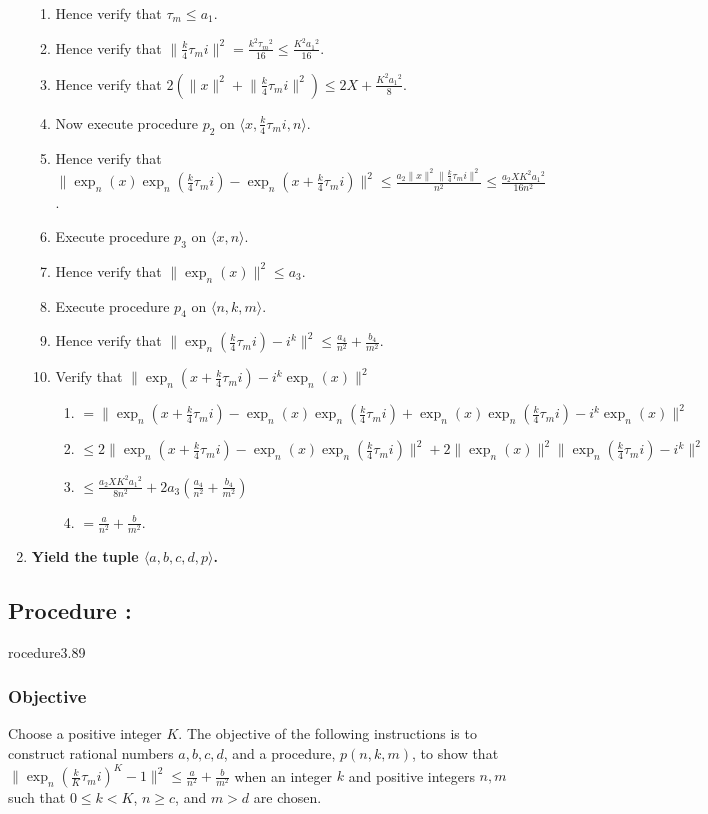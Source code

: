 \documentclass{article}
\newcounter{procedure}[part]
\newcommand{\procedure}[1]{\subsection*{Procedure \thepart:\theprocedure}\label{sec:procedure #1}\global\expandafter\edef\csname procedure#1\endcsname{\thepart:\theprocedure}\addtocounter{procedure}{1}}
\newcommand{\objective}{\subsubsection*{Objective}}
\begin{document}
\begin{multicols}{2}
\begin{enumerate}
\begin{enumerate}
						\item Hence verify that $\tau_m\le a_1$.
						\item Hence verify that $\lVert\frac{k}{4}\tau_m i\rVert^2=\frac{k^2{\tau_m}^2}{16}\le\frac{K^2{a_1}^2}{16}$.
						\item Hence verify that $2(\lVert x\rVert^2+\lVert\frac{k}{4}\tau_m i\rVert^2)\le 2X+\frac{K^2{a_1}^2}{8}$.
						\item Now execute procedure $p_2$ on $\langle x,\frac{k}{4}\tau_m i,n\rangle$.
						\item Hence verify that $\lVert\exp_n(x)\exp_n(\frac{k}{4}\tau_m i)-\exp_n(x+\frac{k}{4}\tau_m i)\rVert^2\le\frac{a_2\lVert x\rVert^2\lVert\frac{k}{4}\tau_m i\rVert^2}{n^2}\le\frac{a_2XK^2{a_1}^2}{16n^2}$.
						\item Execute procedure $p_3$ on $\langle x,n\rangle$.
						\item Hence verify that $\lVert\exp_n(x)\rVert^2\le a_3$.
						\item Execute procedure $p_4$ on $\langle n,k,m\rangle$.
						\item Hence verify that $\lVert\exp_n(\frac{k}{4}\tau_mi)-i^k\rVert^2\le\frac{a_4}{n^2}+\frac{b_4}{m^2}$.
						\item Verify that $\lVert\exp_n(x+\frac{k}{4}\tau_m i)-i^k\exp_n(x)\rVert^2$
						\begin{enumerate}
							\item $=\lVert\exp_n(x+\frac{k}{4}\tau_m i)-\exp_n(x)\exp_n(\frac{k}{4}\tau_m i)+\exp_n(x)\exp_n(\frac{k}{4}\tau_m i)-i^k\exp_n(x)\rVert^2$
							\item $\le 2\lVert\exp_n(x+\frac{k}{4}\tau_m i)-\exp_n(x)\exp_n(\frac{k}{4}\tau_m i)\rVert^2+2\lVert\exp_n(x)\rVert^2\lVert\exp_n(\frac{k}{4}\tau_m i)-i^k\rVert^2$
							\item $\le\frac{a_2XK^2{a_1}^2}{8n^2}+2a_3(\frac{a_4}{n^2}+\frac{b_4}{m^2})$
							\item $=\frac{a}{n^2}+\frac{b}{m^2}$.
						\end{enumerate}
					\end{enumerate}
					\item \textbf{Yield the tuple $\langle a,b,c,d,p\rangle$.}
				\end{enumerate}
		\procedure{3.89}
			\objective
				Choose a positive integer $K$. The objective of the following instructions is to construct rational numbers $a,b,c,d$, and a procedure, $p(n,k,m)$, to show that $\lVert\exp_n(\frac{k}{K}\tau_m i)^K-1\rVert^2\le\frac{a}{n^2}+\frac{b}{m^2}$ when an integer $k$ and positive integers $n,m$ such that $0\le k<K$, $n\ge c$, and $m>d$ are chosen.

\end{multicols}
\end{document}

